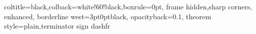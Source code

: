 %
{coltitle=black,colback=white!60!black,boxrule=0pt,
frame hidden,sharp corners, enhanced,
borderline west={3pt}{0pt}{black},
opacityback=0.1,
theorem style=plain,terminator sign dash}{fr}

\newcommand{\N}{\mathbb{N}}
\newcommand{\Z}{\mathbb{Z}}
\newcommand{\Q}{\mathbb{Q}}
\newcommand{\R}{\mathbb{R}}
\newcommand{\C}{\mathbb{C}}

\newcommand{\mangle}[1]{\measuredangle #1}
\newcommand{\sangle}[1]{\sphericalangle #1}


